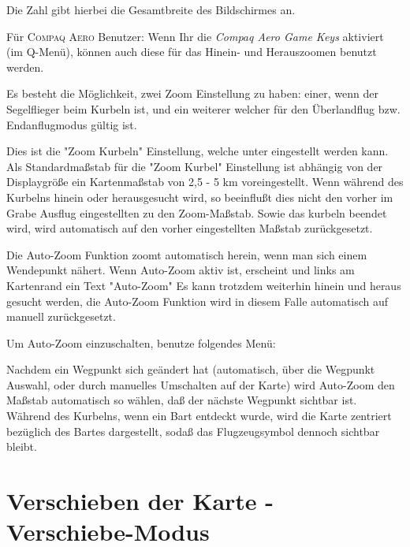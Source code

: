 Die Zahl gibt hierbei die Gesamtbreite des Bildschirmes an.

Für \textsc{Compaq Aero} Benutzer: Wenn Ihr die \textsl{Compaq Aero Game Keys} aktiviert (im Q-Menü), können auch diese für das Hinein- und Herauszoomen benutzt werden.

Es besteht die Möglichkeit, zwei Zoom Einstellung zu haben: einer, wenn der Segelflieger beim Kurbeln ist, und ein weiterer welcher für den Überlandflug bzw. Endanflugmodus gültig ist.

Dies ist die "Zoom Kurbeln" Einstellung, welche unter  eingestellt werden kann.
\halt
Als Standardmaßstab für die "Zoom Kurbel" Einstellung ist abhängig  von der Displaygröße ein Kartenmaßstab von 2,5 - 5 km voreingestellt.
Wenn während des Kurbelns hinein oder herausgesucht wird, so beeinflußt dies nicht den vorher im Grabe Ausflug eingestellten zu den Zoom-Maßstab. Sowie das kurbeln beendet wird, wird automatisch auf den vorher eingestellten Maßstab zurückgesetzt.

Die Auto-Zoom Funktion zoomt automatisch herein, wenn man sich einem Wendepunkt nähert.
Wenn Auto-Zoom aktiv ist, erscheint und links am Kartenrand ein Text "Auto-Zoom"
Es kann trotzdem weiterhin hinein und heraus gesucht werden, die Auto-Zoom Funktion wird in diesem Falle automatisch auf manuell zurückgesetzt.


Um Auto-Zoom einzuschalten, benutze folgendes Menü:
\begin{quote}
\blink{}
\end{quote}

Nachdem ein Wegpunkt sich geändert hat (automatisch, über die Wegpunkt Auswahl, oder durch manuelles Umschalten auf der Karte) wird Auto-Zoom den Maßstab automatisch so wählen, daß der nächste Wegpunkt sichtbar ist. Während des Kurbelns, wenn ein Bart entdeckt wurde, wird die Karte zentriert bezüglich des Bartes dargestellt, sodaß das Flugzeugsymbol dennoch sichtbar bleibt.

\section{Verschieben der Karte - Verschiebe-Modus}

